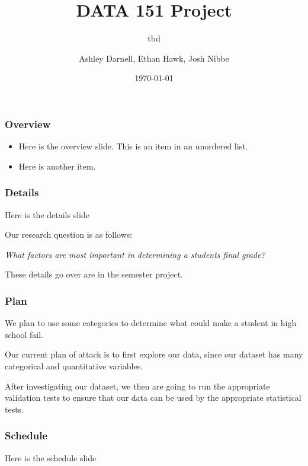 \documentclass{beamer}
\title{DATA 151 Project}
\subtitle{tbd}
\author{Ashley Darnell, Ethan Hawk, Josh Nibbe}
\institute{Valparaiso University}
\date{\today}
\begin{document}
\begin{frame}
\titlepage
\end{frame}


\begin{frame}
\frametitle{Overview}
  \begin{itemize}
    \item Here is the overview slide. This is an item in an unordered list.

    \item Here is another item.
  \end{itemize}
\end{frame}


\begin{frame}
\frametitle{Details}
Here is the details slide

Our research question is as follows:

  \begin{center}
    \textit{What factors are most important in determining a students final grade?}
  \end{center}


These details go over are in the semester project.  
\end{frame}


\begin{frame}
\frametitle{Plan}
We plan to use some categories to determine what could make a student in high school fail. 

Our current plan of attack is to first explore our data, since our dataset has many categorical and 
quantitative variables.

After investigating our dataset, we then are going to run the appropriate validation tests to ensure that our data
can be used by the appropriate statistical tests.


\end{frame}

\begin{frame}
\frametitle{Schedule}
Here is the schedule slide
\end{frame}
\end{document}
